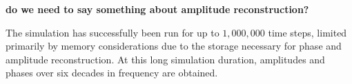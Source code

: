 {\bf do we need to say something about amplitude reconstruction?}

The simulation has successfully been run for up to $1,000,000$ time
steps, limited primarily by memory considerations due to the storage
necessary for phase and amplitude reconstruction. At this long
simulation duration, amplitudes and phases over six decades in
frequency are obtained.
